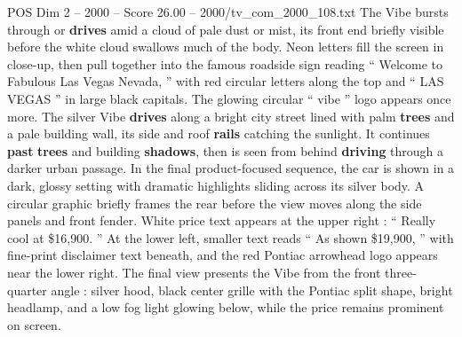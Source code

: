 \begin{textsample}{POS Dim 2 – 2000 – Score 26.00 – 2000/tv\_com\_2000\_108.txt}
The Vibe bursts through or \textbf{drives} amid a cloud of pale dust or mist, its front end briefly visible before the white cloud swallows much of the body.
Neon letters fill the screen in close-up, then pull together into the famous roadside sign reading “ Welcome to Fabulous Las Vegas Nevada, ” with red circular letters along the top and “ LAS VEGAS ” in large black capitals.
The glowing circular “ vibe ” logo appears once more.
The silver Vibe \textbf{drives} along a bright city street lined with palm \textbf{trees} and a pale building wall, its side and roof \textbf{rails} catching the sunlight.
It continues \textbf{past} \textbf{trees} and building \textbf{shadows}, then is seen from behind \textbf{driving} through a darker urban passage.
In the final product-focused sequence, the car is shown in a dark, glossy setting with dramatic highlights sliding across its silver body.
A circular graphic briefly frames the rear before the view moves along the side panels and front fender.
White price text appears at the upper right : “ Really cool at \$16,900. ” At the lower left, smaller text reads “ As shown \$19,900, ” with fine-print disclaimer text beneath, and the red Pontiac arrowhead logo appears near the lower right.
The final view presents the Vibe from the front three-quarter angle : silver hood, black center grille with the Pontiac split shape, bright headlamp, and a low fog light glowing below, while the price remains prominent on screen.

\end{textsample}
